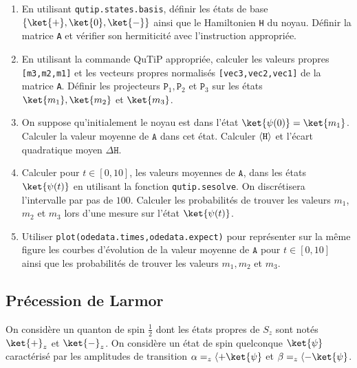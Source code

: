 \begin{enumerate}
\item En utilisant \texttt{qutip.states.basis}, définir les états de base 
$\{\ket{+},\ket{0},\ket{-}\}$ ainsi que le Hamiltonien \texttt{H} du noyau. 
Définir la matrice \texttt{A} et vérifier son hermiticité avec l'instruction 
appropriée.

\item En utilisant la commande QuTiP appropriée, calculer les valeurs propres 
\texttt{[m3,m2,m1]} et les vecteurs propres normalisés \texttt{[vec3,vec2,vec1]} 
de la matrice \texttt{A}. Définir les projecteurs $\mathtt{P}_1,\mathtt{P}_2$ et 
$\mathtt{P}_3$ sur les états $\ket{m_1},\ket{m_2}$ et $\ket{m_3}$.

\item On suppose qu'initialement le noyau est dans l'état 
$\ket{\psi(0)}=\ket{m_1}$. Calculer la valeur moyenne de $\mathtt{A}$ dans cet 
état. Calculer $\langle{\mathtt{H}}\rangle$ et l'écart quadratique moyen $\Delta 
\mathtt{H}$.

\item Calculer pour $t\in[0,10]$, les valeurs moyennes de $\mathtt{A}$, dans 
les états $\ket{\psi(t)}$ en utilisant la fonction \texttt{qutip.sesolve}. On 
discrétisera l'intervalle par pas de $100$. Calculer les probabilités de trouver 
les valeurs $m_1$, $m_2$ et $m_3$ lors d'une mesure sur l'état $\ket{\psi(t)}$.

\item Utiliser \texttt{plot(odedata.times,odedata.expect)} pour représenter sur 
la même figure les courbes d'évolution de la valeur moyenne de $\mathtt{A}$ 
pour $t\in[0,10]$ ainsi que les probabilités de trouver les valeurs $m_1,m_2$ 
et $m_3$.
\end{enumerate}

\subsection{Précession de Larmor}

On considère un quanton de spin $\frac{1}{2}$ dont les états propres de
$S_z$ sont notés $\ket{+}_z$ et $\ket{-}_z$. On considère un état de spin
quelconque $\ket{\psi}$ caractérisé par les amplitudes de transition
$\alpha=_z\langle+\ket{\psi}$ et $\beta=_z\langle-\ket{\psi}$.

